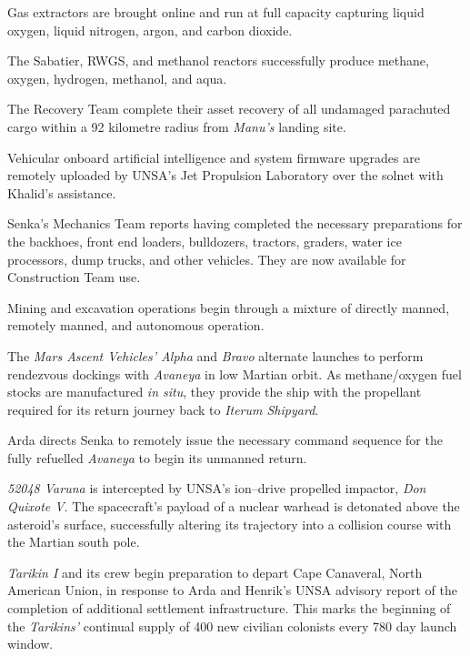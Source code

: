 Gas extractors are brought online and run at full capacity capturing liquid oxygen, liquid nitrogen, argon, and carbon dioxide. 

The Sabatier, RWGS, and methanol reactors successfully produce methane, oxygen, hydrogen, methanol, and aqua.
\StopTimelineDate

The Recovery Team complete their asset recovery of all undamaged parachuted cargo within a 92 kilometre radius from {\it Manu's} landing site.
\StopTimelineDate

Vehicular onboard artificial intelligence and system firmware upgrades are remotely uploaded by UNSA's Jet Propulsion Laboratory over the solnet with Khalid's assistance.

Senka's Mechanics Team reports having completed the necessary preparations for the backhoes, front end loaders, bulldozers, tractors, graders, water ice processors, dump trucks, and other vehicles. They are now available for Construction Team use.

Mining and excavation operations begin through a mixture of directly manned, remotely manned, and autonomous operation.
\StopTimelineDate

The {\it Mars Ascent Vehicles' Alpha} and {\it Bravo} alternate launches to perform rendezvous dockings with {\it Avaneya} in low Martian orbit. As methane/oxygen fuel stocks are manufactured {\it in situ}, they provide the ship with the propellant required for its return journey back to {\it Iterum Shipyard}.
\StopTimelineDate

Arda directs Senka to remotely issue the necessary command sequence for the fully refuelled {\it Avaneya} to begin its unmanned return.
\StopTimelineDate

{\it 52048 Varuna} is intercepted by UNSA's ion--drive propelled impactor, {\it Don Quixote V}. The spacecraft's payload of a nuclear warhead is detonated above the asteroid's surface, successfully altering its trajectory into a collision course with the Martian south pole.
\StopTimelineDate

{\it Tarikin I} and its crew begin preparation to depart Cape Canaveral, North American Union, in response to Arda and Henrik's UNSA advisory report of the completion of additional settlement infrastructure. This marks the beginning of the {\it Tarikins'} continual supply of 400 new civilian colonists every 780 day launch window.
\StopTimelineDate

